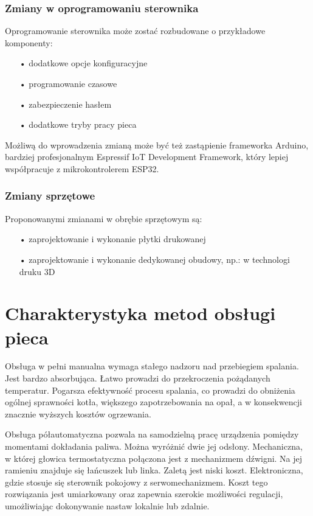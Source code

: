 \documentclass[11pt]{report}
\begin{document}
 \subsection{Zmiany w oprogramowaniu sterownika}
 Oprogramowanie sterownika może zostać rozbudowane o przykładowe komponenty:
 \begin{enumerate}
 \item[•] dodatkowe opcje konfiguracyjne
 \item[•] programowanie czasowe
 \item[•] zabezpieczenie hasłem
 \item[•] dodatkowe tryby pracy pieca
 \end{enumerate}
 Możliwą do wprowadzenia zmianą może być też zastąpienie frameworka Arduino, bardziej profesjonalnym Espressif IoT Development Framework, który lepiej współpracuje z mikrokontrolerem ESP32.
 \subsection{Zmiany sprzętowe}
 Proponowanymi zmianami w obrębie sprzętowym są:
 \begin{enumerate}
 \item[•] zaprojektowanie i wykonanie płytki drukowanej
 \item[•] zaprojektowanie i wykonanie dedykowanej obudowy, np.: w technologi druku 3D
 \end{enumerate}
 

 \chapter{Charakterystyka metod obsługi pieca}\label{ch:charakterystyka}
 Obsługa w pełni manualna wymaga stałego nadzoru nad przebiegiem spalania. Jest bardzo absorbująca. Łatwo prowadzi do przekroczenia pożądanych temperatur. Pogarsza efektywność procesu spalania, co prowadzi do obniżenia ogólnej sprawności kotła, większego zapotrzebowania na opał, a w konsekwencji znacznie wyższych kosztów ogrzewania.
 
 Obsługa półautomatyczna pozwala na samodzielną pracę urządzenia pomiędzy momentami dokładania paliwa. Można wyróżnić dwie jej odsłony. Mechaniczna, w której głowica termostatyczna połączona jest z mechanizmem dźwigni. Na jej ramieniu znajduje się łańcuszek lub linka. Zaletą jest niski koszt. Elektroniczna, gdzie stosuje się sterownik pokojowy z serwomechanizmem. Koszt tego rozwiązania jest umiarkowany oraz zapewnia szerokie możliwości regulacji, umożliwiając dokonywanie nastaw lokalnie lub zdalnie. 
 
\end{document}
